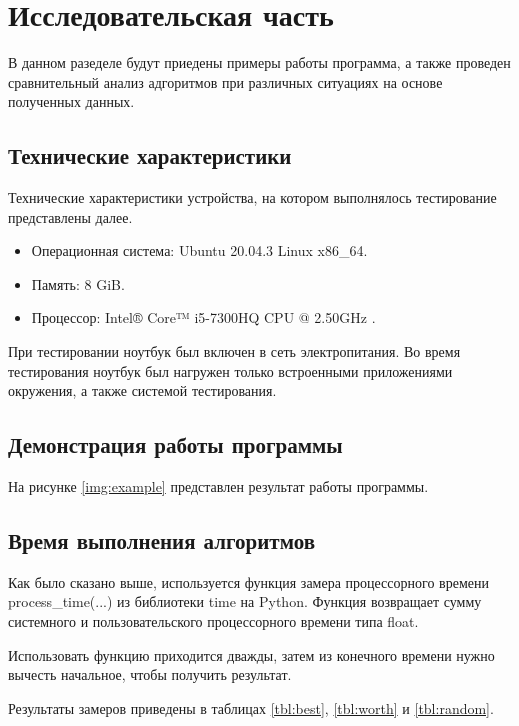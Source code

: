 \chapter{Исследовательская часть}

В данном разеделе будут приедены примеры работы программа, а также проведен сравнительный анализ адгоритмов при различных ситуациях на основе полученных данных.

\section{Технические характеристики}

Технические характеристики устройства, на котором выполнялось тестирование представлены далее.

\begin{itemize}
    \item Операционная система: Ubuntu 20.04.3 \cite{ubuntu} Linux \cite{linux} x86\_64.
    \item Память: 8 GiB.
    \item Процессор: Intel® Core™ i5-7300HQ CPU @ 2.50GHz \cite{intel}.
\end{itemize}

При тестировании ноутбук был включен в сеть электропитания. Во время тестирования ноутбук был нагружен только встроенными приложениями окружения, а также системой тестирования.

\section{Демонстрация работы программы}

На рисунке \ref{img:example} представлен результат работы программы.

\clearpage

\section{Время выполнения алгоритмов}

Как было сказано выше, используется функция замера процессорного времени process\_time(...) из библиотеки time на Python. Функция возвращает сумму системного и пользовательского процессорного времени типа float.

Использовать функцию приходится дважды, затем из конечного времени нужно вычесть начальное, чтобы получить результат.

Результаты замеров приведены в таблицах \ref{tbl:best}, \ref{tbl:worth} и \ref{tbl:random}.

